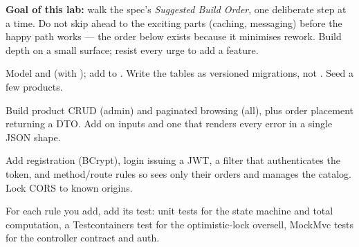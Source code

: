 \begin{writespace}
\end{writespace}

\begin{writespace}
\end{writespace}


\textbf{Goal of this lab:} walk the spec's \emph{Suggested Build Order}, one deliberate step at a time. Do not skip ahead to the exciting parts (caching, messaging) before the happy path works --- the order below exists because it minimises rework. Build depth on a small surface; resist every urge to add a feature.

\resetlab
{}
Model  and  (with ); add  to . Write the tables as versioned migrations, not . Seed a few products.

Build product CRUD (admin) and paginated browsing (all), plus order placement returning a DTO. Add  on inputs and one  that renders every error in a single JSON shape.

Add registration (BCrypt), login issuing a JWT, a filter that authenticates the token, and method/route rules so  sees only their orders and  manages the catalog. Lock CORS to known origins.

For each rule you add, add its test: unit tests for the state machine and total computation, a Testcontainers test for the optimistic-lock oversell, MockMvc tests for the controller contract and auth.

